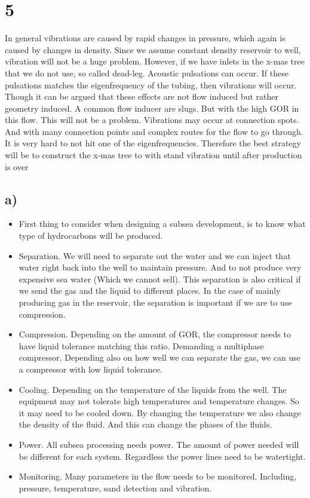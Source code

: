 \documentclass[DIV=calc, paper=a4, fontsize=13pt, twocolumn]{scrartcl}	 %
\begin{document}
\section*{5}
In general vibrations are caused by rapid changes in pressure, which again is caused by changes in density. Since we assume constant density reservoir to well, vibration will not be a huge problem.
\newline
However, if we have inlets in the x-mas tree that we do not use, so called dead-leg. Acoustic pulsations can occur. If these pulsations matches the eigenfrequency of the tubing, then vibrations will occur. Though it can be argued that these effects are not flow induced but rather geometry induced. 
\newline
A common flow inducer are slugs. But with the high GOR in this flow. This will not be a problem. 
\newline
Vibrations may occur at connection spots. And with many connection points and complex routes for the flow to go through. It is very hard to not hit one of the eigenfrequencies. Therefore the best strategy will be to construct the x-mas tree to with stand vibration until after production is over  

\subsection*{a)}
\begin{itemize}
\item First thing to consider when designing a subsea development, is to know what type of hydrocarbons will be produced. 
\item Separation.  We will need to separate out the water and we can inject that water right back into the well to maintain pressure. And to not produce very expensive sea water (Which we cannot sell). This separation is also critical if we send the gas and the liquid to different places. In the case of mainly producing gas in the reservoir, the separation is important if we are to use compression.
\item Compression. Depending on the amount of GOR, the compressor needs to have liquid tolerance matching this ratio. Demanding a multiphase compressor. Depending also on how well we can separate the gas, we can use a compressor with low liquid tolerance. 
\item Cooling. Depending on the temperature of the liquids from the well. The equipment may not tolerate high temperatures and temperature changes. So it may need to be cooled down. By changing the temperature we also change the density of the fluid. And this can change the phases of the fluids.
\item Power. All subsea processing needs power. The amount of power needed will be different for each system. Regardless the power lines need to be watertight. 
\item Monitoring. Many parameters in the flow needs to be monitored. Including, pressure, temperature, sand detection and vibration.
\end{itemize}
\end{document}
